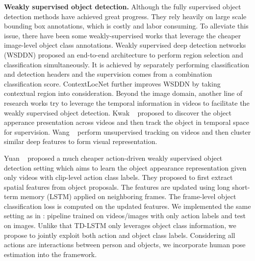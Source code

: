 \textbf{Weakly supervised object detection.}
Although the fully supervised object detection methods have achieved great progress. They rely heavily on large scale bounding box annotations, which is costly and labor consuming. To alleviate this issue, there have been some weakly-supervised works \cite{} that leverage the cheaper image-level object class annotations. Weakly supervised deep detection networks (WSDDN) \cite{bilen2016weakly} proposed an end-to-end architecture to perform region selection and classification simultaneously. It is achieved by separately performing classification and detection headers and the supervision comes from a combination classification score. ContextLocNet \cite{kantorov2016contextlocnet} further improves WSDDN by taking contextual region into consideration. Beyond the image domain, another line of research works \cite{kwak2015unsupervised,wang2015unsupervised} try to leverage the temporal information in videos to facilitate the weakly supervised object detection. Kwak \etal~\cite{kwak2015unsupervised}  proposed to discover the object apperance presentation across videos and then track the object in temporal space for supervision. Wang \etal~\cite{wang2015unsupervised} perform unsupervised tracking on videos and then cluster similar deep features to form visual representation.

Yuan \etal~\cite{yuan2017temporal} proposed a much cheaper action-driven weakly supervised object detection setting which aims to learn the object appearance representation given only videos with clip-level action class labels. They proposed to first extract spatial features from object proposals. The features are updated using long short-term memory (LSTM) \cite{hochreiter1997long} applied on neighboring frames. The frame-level object classification loss is computed on the updated features. We implemented the same setting as in \cite{yuan2017temporal}: pipeline trained on videos/images with only action labels and test on images. Unlike that TD-LSTM \cite{yuan2017temporal} only leverages object class information, we propose to jointly exploit both action and object class labels. Considering all actions are interactions between person and objects, we incorporate human pose estimation into the framework.


